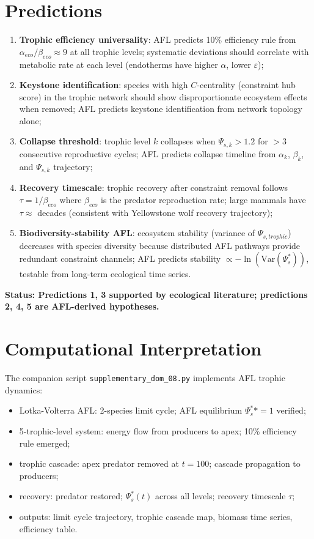 \documentclass[11pt]{article}
\begin{document}
\section{Predictions}

\begin{enumerate}
    \item \textbf{Trophic efficiency universality}: AFL predicts 10\% efficiency rule from
          $\alpha_{eco}/\beta_{eco} \approx 9$ at all trophic levels; systematic deviations
          should correlate with metabolic rate at each level (endotherms have higher $\alpha$,
          lower $\varepsilon$);
    \item \textbf{Keystone identification}: species with high $C$-centrality (constraint hub score)
          in the trophic network should show disproportionate ecosystem effects when removed;
          AFL predicts keystone identification from network topology alone;
    \item \textbf{Collapse threshold}: trophic level $k$ collapses when $\Psi_{s,k} > 1.2$ for
          $>3$ consecutive reproductive cycles; AFL predicts collapse timeline from $\alpha_k$,
          $\beta_k$, and $\Psi_{s,k}$ trajectory;
    \item \textbf{Recovery timescale}: trophic recovery after constraint removal follows $\tau =
          1/\beta_{eco}$ where $\beta_{eco}$ is the predator reproduction rate; large mammals
          have $\tau \approx$ decades (consistent with Yellowstone wolf recovery trajectory);
    \item \textbf{Biodiversity-stability AFL}: ecosystem stability (variance of $\Psi_{s,trophic}$)
          decreases with species diversity because distributed AFL pathways provide redundant
          constraint channels; AFL predicts stability $\propto -\ln(\text{Var}(\Psi_s^*))$, testable
          from long-term ecological time series.
\end{enumerate}

\textbf{Status: Predictions 1, 3 supported by ecological literature; predictions 2, 4, 5 are
AFL-derived hypotheses.}

\section{Computational Interpretation}

The companion script \texttt{supplementary\_dom\_08.py} implements AFL trophic dynamics:
\begin{itemize}
    \item Lotka-Volterra AFL: 2-species limit cycle; AFL equilibrium $\Psi_s^** = 1$ verified;
    \item 5-trophic-level system: energy flow from producers to apex; 10\% efficiency rule emerged;
    \item trophic cascade: apex predator removed at $t = 100$; cascade propagation to producers;
    \item recovery: predator restored; $\Psi_s^*(t)$ across all levels; recovery timescale $\tau$;
    \item outputs: limit cycle trajectory, trophic cascade map, biomass time series, efficiency table.
\end{itemize}
\end{document}
